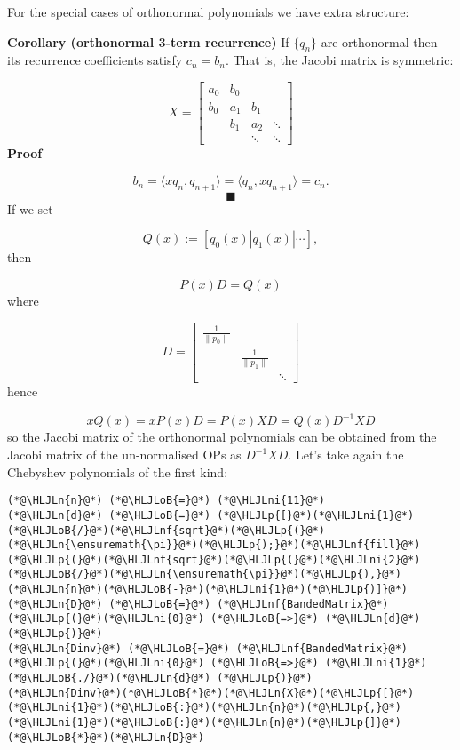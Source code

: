 \documentclass[12pt,landscape]{article}
\newcommand{\HLJLn}[1]{#1}
\newcommand{\HLJLnf}[1]{\textcolor[RGB]{66,102,213}{#1}}
\newcommand{\HLJLni}[1]{\textcolor[RGB]{59,151,46}{#1}}
\newcommand{\HLJLoB}[1]{\textcolor[RGB]{102,102,102}{\textbf{#1}}}
\newcommand{\HLJLp}[1]{#1}
\begin{document}
{For the special cases of orthonormal polynomials we have extra structure:

\textbf{Corollary (orthonormal 3-term recurrence)} If $\{q_n\}$ are orthonormal then its recurrence coefficients satisfy $c_n = b_n$. That is, the Jacobi matrix is symmetric:

\[
X = \begin{bmatrix} a_0 & b_0 \\
                                                        b_0 & a_1 & b_1\\
                                                        & b_1 & a_2 & \ensuremath{\ddots} \\
                                                        && \ensuremath{\ddots} & \ensuremath{\ddots}
                                                        \end{bmatrix}
\]
\textbf{Proof}

\[
b_n = \ensuremath{\langle}x q_n, q_{n+1}\ensuremath{\rangle} = \ensuremath{\langle}q_n, x q_{n+1}\ensuremath{\rangle} = c_{n}.
\]
\[
\blacksquare
\]
If we set

\[
Q(x) := [q_0(x) | q_1(x) | \ensuremath{\cdots}],
\]
then

\[
P(x)D = Q(x)
\]
where

\[
D = \begin{bmatrix}
\frac{1}{\|p_0 \|} &   &     \\
                   & \frac{1}{\|p_1 \|} &   \\
                   &                    & \ddots
\end{bmatrix}
\]
hence 

\[
xQ(x) = xP(x)D = P(x)XD = Q(x)D^{-1}XD
\]
so the Jacobi matrix of the orthonormal polynomials can be obtained from the Jacobi matrix of the un-normalised OPs as $D^{-1}XD$.  Let's take again the Chebyshev polynomials of the first kind:


\begin{lstlisting}
(*@\HLJLn{n}@*) (*@\HLJLoB{=}@*) (*@\HLJLni{11}@*)
(*@\HLJLn{d}@*) (*@\HLJLoB{=}@*) (*@\HLJLp{[}@*)(*@\HLJLni{1}@*)(*@\HLJLoB{/}@*)(*@\HLJLnf{sqrt}@*)(*@\HLJLp{(}@*)(*@\HLJLn{\ensuremath{\pi}}@*)(*@\HLJLp{);}@*)(*@\HLJLnf{fill}@*)(*@\HLJLp{(}@*)(*@\HLJLnf{sqrt}@*)(*@\HLJLp{(}@*)(*@\HLJLni{2}@*)(*@\HLJLoB{/}@*)(*@\HLJLn{\ensuremath{\pi}}@*)(*@\HLJLp{),}@*)(*@\HLJLn{n}@*)(*@\HLJLoB{-}@*)(*@\HLJLni{1}@*)(*@\HLJLp{)]}@*)
(*@\HLJLn{D}@*) (*@\HLJLoB{=}@*) (*@\HLJLnf{BandedMatrix}@*)(*@\HLJLp{(}@*)(*@\HLJLni{0}@*) (*@\HLJLoB{=>}@*) (*@\HLJLn{d}@*)(*@\HLJLp{)}@*)
(*@\HLJLn{Dinv}@*) (*@\HLJLoB{=}@*) (*@\HLJLnf{BandedMatrix}@*)(*@\HLJLp{(}@*)(*@\HLJLni{0}@*) (*@\HLJLoB{=>}@*) (*@\HLJLni{1}@*) (*@\HLJLoB{./}@*)(*@\HLJLn{d}@*) (*@\HLJLp{)}@*)
(*@\HLJLn{Dinv}@*)(*@\HLJLoB{*}@*)(*@\HLJLn{X}@*)(*@\HLJLp{[}@*)(*@\HLJLni{1}@*)(*@\HLJLoB{:}@*)(*@\HLJLn{n}@*)(*@\HLJLp{,}@*)(*@\HLJLni{1}@*)(*@\HLJLoB{:}@*)(*@\HLJLn{n}@*)(*@\HLJLp{]}@*)(*@\HLJLoB{*}@*)(*@\HLJLn{D}@*)
\end{lstlisting}

}
\end{document}
